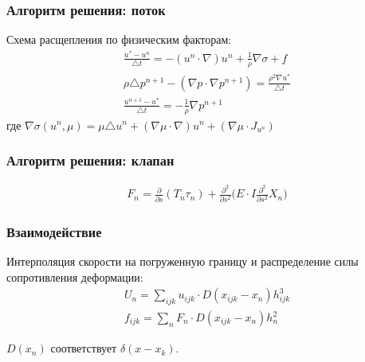 \documentclass[14pt]{beamer}
\begin{document}
\begin{frame}
\frametitle{Алгоритм решения: поток}
Схема расщепления по физическим факторам:
\begin{gather}
    \label{eq:split_first}
    \frac{u^* - u^n}{\triangle t} = - (u^n \cdot \nabla) u^n + \frac{1}{\rho} \nabla \sigma + f\\
    \label{eq:split_second}
    \rho \triangle p^{n+1} - (\nabla p \cdot \nabla p^{n+1}) = \frac{\rho^2 \nabla u^*}{\triangle t}\\
    \label{eq:split_third}
    \frac{u^{n+1} - u^*}{\triangle t} = - \frac{1}{\rho} \nabla p^{n+1}
\end{gather}
где $\nabla \sigma (u^n, \mu) = \mu \triangle u^n + (\nabla \mu \cdot \nabla) u^n + (\nabla \mu \cdot J_{u^n}) $
\end{frame}

\begin{frame}
\frametitle{Алгоритм решения: клапан}
\begin{gather}
    \label{eq:strain_energy}
    F_{n} =  \frac{\partial}{\partial s}(T_{n} \tau_{n}) + \frac{\partial^2}{\partial s^2} \Big( E \cdot I \frac{\partial^2}{\partial s^2} X_{n} \Big)
\end{gather}
\end{frame}

\begin{frame}
\frametitle{Взаимодействие}
Интерполяция скорости на погруженную границу и распределение силы сопротивления деформации:
\begin{gather}
    \label{eq:interpolation}
    U_n = \sum_{ijk}u_{ijk} \cdot D(x_{ijk} - x_n) h_{ijk}^3 \\
    \label{eq:spreading}
    f_{ijk} = \sum_n F_n \cdot D(x_{ijk} - x_n) h^2_n
\end{gather}

$D(x_n)$ соответствует $\delta(x - x_k)$.
\end{frame}
\end{document}
